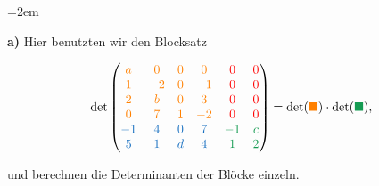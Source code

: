 \begin{solution}    

    \vspace{1\baselineskip}

    \leftskip=2em

    \textbf{a)} Hier benutzten wir den Blocksatz

    \begin{equation*}
        \text{det} \begin{pmatrix}
            \textcolor{orange}{a} & \textcolor{orange}{0} & \textcolor{orange}{0} & \textcolor{orange}{0} & \textcolor{red}{0} & \textcolor{red}{0} \\
            \textcolor{orange}{1} & \textcolor{orange}{-2} & \textcolor{orange}{0} & \textcolor{orange}{-1} & \textcolor{red}{0} & \textcolor{red}{0} \\
            \textcolor{orange}{2} & \textcolor{orange}{b} & \textcolor{orange}{0} & \textcolor{orange}{3} & \textcolor{red}{0} & \textcolor{red}{0} \\
            \textcolor{orange}{0} & \textcolor{orange}{7} & \textcolor{orange}{1} & \textcolor{orange}{-2} & \textcolor{red}{0} & \textcolor{red}{0} \\
            \textcolor{RoyalBlue}{-1} & \textcolor{RoyalBlue}{4} & \textcolor{RoyalBlue}{0} & \textcolor{RoyalBlue}{7} & \textcolor{ForestGreen}{-1} & \textcolor{ForestGreen}{c} \\
            \textcolor{RoyalBlue}{5} & \textcolor{RoyalBlue}{1} & \textcolor{RoyalBlue}{d} & \textcolor{RoyalBlue}{4} & \textcolor{ForestGreen}{1} & \textcolor{ForestGreen}{2} 
            \end{pmatrix} = \text{det}(\textcolor{orange}{\blacksquare}) \cdot \text{det}(\textcolor{ForestGreen}{\blacksquare}),
    \end{equation*}

    und berechnen die Determinanten der Blöcke einzeln.


\end{solution}
